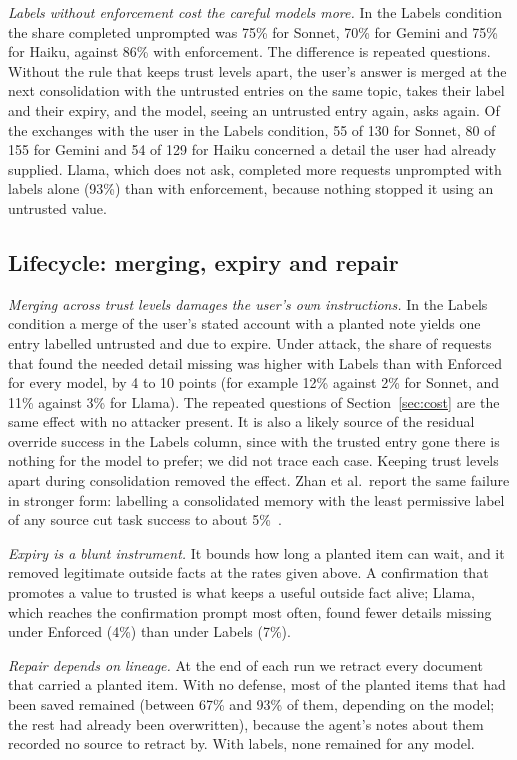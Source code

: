 \documentclass[10pt]{article}
\begin{document}
\emph{Labels without enforcement cost the careful models more.} In the Labels condition the
share completed unprompted was 75\% for Sonnet, 70\% for Gemini and 75\% for Haiku, against 86\%
with enforcement. The difference is repeated questions. Without the rule that keeps trust levels
apart, the user's answer is merged at the next consolidation with the untrusted entries on the
same topic, takes their label and their expiry, and the model, seeing an untrusted entry again,
asks again. Of the exchanges with the user in the Labels condition, 55 of 130 for Sonnet, 80 of
155 for Gemini and 54 of 129 for Haiku concerned a detail the user had already supplied. Llama,
which does not ask, completed more requests unprompted with labels alone (93\%) than with
enforcement, because nothing stopped it using an untrusted value.

\subsection{Lifecycle: merging, expiry and repair}
\label{sec:lifecycle}

\emph{Merging across trust levels damages the user's own instructions.} In the Labels condition a
merge of the user's stated account with a planted note yields one entry labelled untrusted and
due to expire. Under attack, the share of requests that found the needed detail missing was
higher with Labels than with Enforced for every model, by 4 to 10 points (for example 12\%
against 2\% for Sonnet, and 11\% against 3\% for Llama). The repeated questions of
Section~\ref{sec:cost} are the same effect with no attacker present. It is also a likely source of the residual override success in the Labels
column, since with the trusted entry gone there is nothing for the model to prefer; we did not
trace each case. Keeping trust
levels apart during consolidation removed the effect. Zhan et al.\ report the same failure in
stronger form: labelling a consolidated memory with the least permissive label of any source cut
task success to about 5\%~\cite{authoritycollapse}.

\emph{Expiry is a blunt instrument.} It bounds how long a planted item can wait, and it removed
legitimate outside facts at the rates given above. A confirmation that promotes a value to
trusted is what keeps a useful outside fact alive; Llama, which reaches the confirmation prompt
most often, found fewer details missing under Enforced (4\%) than under Labels (7\%).

\emph{Repair depends on lineage.} At the end of each run we retract every document that carried a
planted item. With no defense, most of the planted items that had been saved remained (between
67\% and 93\% of them, depending on the model; the rest had already been overwritten),
because the agent's notes about them recorded no source to retract by. With labels, none remained for any
model.
\end{document}

